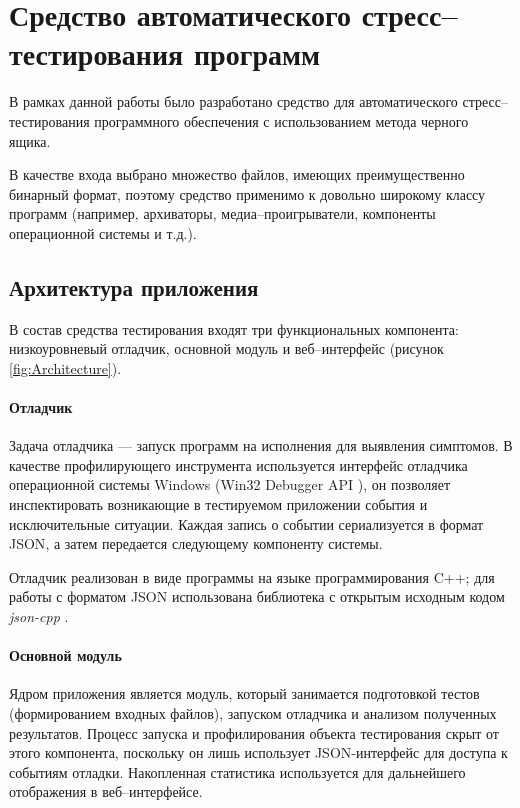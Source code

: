 \documentclass[a4paper,14pt,href]{article}
\begin{document}
\section{Средство автоматического стресс--тес\-ти\-ро\-ва\-ния программ}
	В рамках данной работы было разработано средство для автоматического стресс--тестирования программного обеспечения с использованием метода черного ящика. 

	В качестве входа выбрано множество файлов, имеющих преимущественно бинарный формат, поэтому средство применимо к довольно широкому классу программ (например, архиваторы, медиа--проигрыватели, компоненты операционной системы и т.д.). 

\subsection{Архитектура приложения}
	В состав средства тестирования входят три функциональных компонента: низкоуровневый отладчик, основной модуль и веб--интерфейс (рисунок \ref{fig:Architecture}). 

\paragraph{Отладчик} Задача отладчика --- запуск программ на исполнения для выявления симптомов. В качестве профилирующего инструмента используется интерфейс отладчика операционной системы Windows (Win32 De\-bugger API \cite{win32debugger}), он позволяет инспектировать возникающие в тестируемом приложении события и исключительные ситуации. Каждая запись о событии сериализуется в формат JSON\cite{json}, а затем передается следующему компоненту системы. 

Отладчик реализован в виде программы на языке программирования C++; для работы с форматом JSON использована библиотека с открытым исходным кодом \textit{json-cpp} \cite{jsoncpp}.

\paragraph{Основной модуль} Ядром приложения является модуль, который занимается подготовкой тестов (формированием входных файлов), запуском отладчика и анализом полученных результатов. Процесс запуска и профилирования объекта тестирования скрыт от этого компонента, поскольку он лишь использует JSON-интерфейс для доступа к событиям отладки. Накопленная статистика используется для дальнейшего отображения в веб--интерфейсе.
\end{document}
